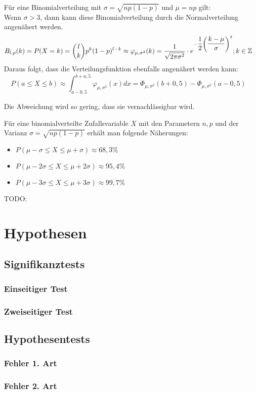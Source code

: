 \documentclass[main.tex]{subfiles}
\begin{document}
\begin{Theorem}
  Für eine Binomialverteilung mit $\sigma = \sqrt{np(1-p)}$ und $\mu = np$ gilt:\\
  Wenn $\sigma>3$, dann kann diese Binomialverteilung durch die Normalverteilung angenähert werden.
  $$B_{l,p}(k) = P(X=k) = {l \choose k} p^k (1-p) ^{l-k} \approx \varphi_{\mu,\sigma^2}(k) = \dfrac {1}{\sqrt {2\pi \sigma^2}} \cdot e^{- \dfrac{1}{2} \left(\dfrac{k-\mu}{\sigma}\right)^2};k\in \mathbb{Z}$$
  Daraus folgt, dass die Verteilungsfunktion ebenfalls angenähert werden kann:
  $$P(a \leq X \leq b) \approx \int_{a-0,5}^{b+a,5}\varphi_{\mu,\sigma^2}(x)dx = \Phi_{\mu,\sigma^2}(b+0,5)-\Phi_{\mu,\sigma^2}(a-0,5)$$
\end{Theorem}
\begin{Beweis}
  Die Abweichung wird so gering, dass sie vernachlässigbar wird.
\end{Beweis}
\begin{Theorem}
  Für eine binomialverteilte Zufallsvariable $X$ mit den Parametern $n,p$ und der Varianz $\sigma = \sqrt{np(1-p)}$ erhält man folgende Näherungen:
  \begin{itemize}
    \item $P(\mu - \sigma \leq X \leq \mu + \sigma) \approx 68,3\%$
    \item $P(\mu - 2\sigma \leq X \leq \mu + 2\sigma) \approx 95,4\%$
    \item $P(\mu - 3\sigma \leq X \leq \mu + 3\sigma) \approx 99,7\%$
  \end{itemize}
\end{Theorem}

TODO:
\section{Hypothesen}
\subsection{Signifikanztests}
\subsubsection{Einseitiger Test}
\subsubsection{Zweiseitiger Test}
\subsection{Hypothesentests}
\subsubsection{Fehler 1. Art}
\subsubsection{Fehler 2. Art}
\end{document}
